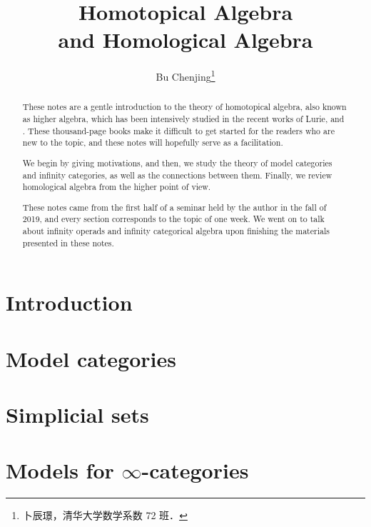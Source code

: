 \documentclass[twoside]{article}
\begin{document}
\title{Homotopical Algebra\\and Homological Algebra}
\author{Bu Chenjing\footnote{卜辰璟，清华大学数学系数 72 班．}}

\begin{abstract}
    These notes are a gentle introduction to the theory of
    homotopical algebra, also known as higher algebra,
    which has been intensively studied in the recent works of Lurie,
    \cite{htt} and \cite{ha}.
    These thousand-page books make it difficult to get started for the readers 
    who are new to the topic, and these notes will hopefully 
    serve as a facilitation.
    
    We begin by giving motivations, and then,
    we study the theory of model categories and infinity categories,
    as well as the connections between them.
    Finally, we review homological algebra from the higher point of view.

    These notes came from the first half of
    a seminar held by the author in the fall of 2019,
    and every section corresponds to the topic of one week.
    We went on to talk about infinity operads and infinity categorical algebra 
    upon finishing the materials presented in these notes.
\end{abstract}

\tableofcontents
\clearpage

\section{Introduction}



\section{Model categories}



\section{Simplicial sets}



\section{Models for \texorpdfstring{$\infty$}{∞}-categories}


\end{document}
